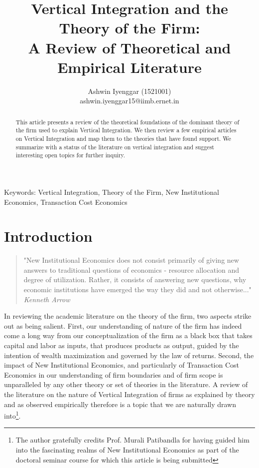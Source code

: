 \documentclass[12pt]{article}
\begin{document}
\title{Vertical Integration and the Theory of the Firm:\\  A Review of Theoretical and Empirical Literature}
\author{Ashwin Iyenggar  (1521001) \\ ashwin.iyenggar15@iimb.ernet.in} 


\maketitle
\thispagestyle{empty}

\begin{abstract}
This article presents a review of the theoretical foundations of the dominant theory of the firm used to explain Vertical Integration. We then review a few empirical articles on Vertical Integration and map them to the theories that have found support. We summarize with a status of the literature on vertical integration and suggest interesting open topics for further inquiry. 
\end{abstract}

{Keywords:} Vertical Integration, Theory of the Firm, New Institutional Economics, Transaction Cost Economics

\section{Introduction}\label{S:Introduction}

\begin{quotation}
"New Institutional Economics does not consist primarily of giving new answers to traditional questions of economics - resource allocation and degree of utilization. Rather, it consists of answering new questions, why economic institutions have emerged the way they did and not otherwise..."\\ \null\hfill \textit{Kenneth Arrow}
\end{quotation}

In reviewing the academic literature on the theory of the firm, two aspects strike out as being salient. First, our understanding of nature of the firm has indeed come a long way from our conceptualization of the firm as a black box that takes capital and labor as inputs, that produces products as output, guided by the intention of wealth maximization and governed by the law of returns. Second, the impact of New Institutional Economics, and particularly of Transaction Cost Economics in our understanding of firm boundaries and of firm scope is unparalleled by any other theory or set of theories in the literature. A review of the literature on the nature of Vertical Integration of firms as explained by theory and as observed empirically therefore is a topic that we are naturally drawn into\footnote{The author gratefully credits Prof. Murali Patibandla for having guided him into the fascinating realms of New Institutional Economics as part of the doctoral seminar course for which this article is being submitted}.
\end{document}
